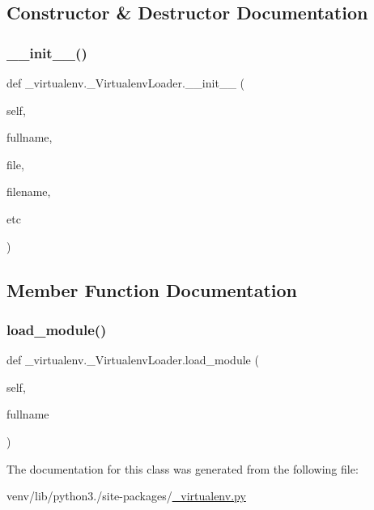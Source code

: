 \subsection{Constructor \& Destructor Documentation}
\mbox{\label{class__virtualenv_1_1__VirtualenvLoader_a4611e5bf5e1d70408eab80c0c87f9bba}} 
\subsubsection{\texorpdfstring{\+\_\+\+\_\+init\+\_\+\+\_\+()}{\_\_init\_\_()}}
{\footnotesize\ttfamily def \+\_\+virtualenv.\+\_\+\+Virtualenv\+Loader.\+\_\+\+\_\+init\+\_\+\+\_\+ (\begin{DoxyParamCaption}\item[{}]{self,  }\item[{}]{fullname,  }\item[{}]{file,  }\item[{}]{filename,  }\item[{}]{etc }\end{DoxyParamCaption})}



\subsection{Member Function Documentation}
\mbox{\label{class__virtualenv_1_1__VirtualenvLoader_ad03c12435e090cf72ae08888d2c51c75}} 
\subsubsection{\texorpdfstring{load\+\_\+module()}{load\_module()}}
{\footnotesize\ttfamily def \+\_\+virtualenv.\+\_\+\+Virtualenv\+Loader.\+load\+\_\+module (\begin{DoxyParamCaption}\item[{}]{self,  }\item[{}]{fullname }\end{DoxyParamCaption})}



The documentation for this class was generated from the following file\+:\begin{DoxyCompactItemize}
\item 
venv/lib/python3./site-\/packages/\hyperlink{__virtualenv_8py}{\+\_\+virtualenv.\+py}\end{DoxyCompactItemize}
